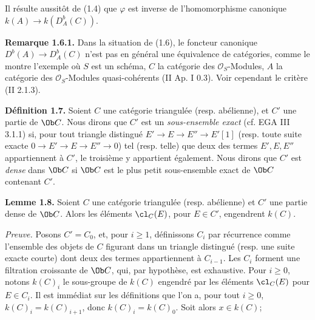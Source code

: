 Il
résulte aussitôt de (1.4) que \(\varphi\) est inverse de l'homomorphisme canonique \(k(A)\longrightarrow k(D_A^b(C))\).

\textbf{Remarque 1.6.1.} Dans la situation de (1.6), le foncteur canonique \(D^b(A)\longrightarrow D_A^b(C)\) n'est pas en général une équivalence de catégories, comme le montre l'exemple où \(S\) est un schéma, \(C\) la catégorie des \(\mathcal O_S\)-Modules, \(A\) la catégorie des \(\mathcal O_S\)-Modules quasi-cohérents (II Ap. I 0.3). Voir cependant le critère (II 2.1.3).

\textbf{Définition 1.7.} Soient \(C\) une catégorie triangulée (resp. abélienne), et \(C'\) une partie de \(\Ob C\). Nous dirons que \(C'\) est un \emph{sous-ensemble exact} (cf. EGA III 3.1.1) si, pour tout triangle distingué \(E'\to E\to E''\to E'[1]\) (resp. toute suite exacte \(0\to E'\to E\to E''\to0\)) tel (resp. telle) que deux des termes \(E',E,E''\) appartiennent à \(C'\), le troisième y appartient également. Nous dirons que \(C'\) est \emph{dense} dans \(\Ob C\) si \(\Ob C\) est le plus petit sous-ensemble exact de \(\Ob C\) contenant \(C'\).

\textbf{Lemme 1.8.} Soient \(C\) une catégorie triangulée (resp. abélienne) et \(C'\) une partie dense de \(\Ob C\). Alors les éléments \(\cl_C(E)\), pour \(E\in C'\), engendrent \(k(C)\).

\emph{Preuve.} Posons \(C'=C_0\), et, pour \(i\geq1\), définissons \(C_i\) par récurrence comme l'ensemble des objets de \(C\) figurant dans un triangle distingué (resp. une suite exacte courte) dont deux des termes appartiennent à \(C_{i-1}\). Les \(C_i\) forment une filtration croissante de \(\Ob C\), qui, par hypothèse, est exhaustive. Pour \(i\geq0\), notons \(k(C)_i\) le sous-groupe de \(k(C)\) engendré par les éléments \(\cl_C(E)\) pour \(E\in C_i\). Il est immédiat sur les définitions que l'on a, pour tout \(i\geq0\), \(k(C)_i=k(C)_{i+1}\), donc \(k(C)_i=k(C)_0\). Soit alors \(x\in k(C)\); 
